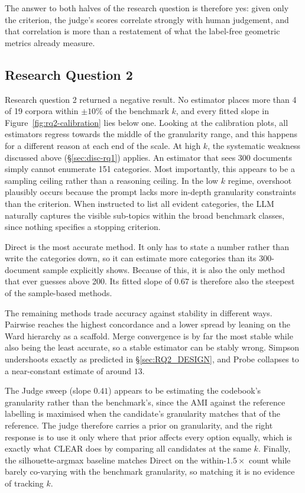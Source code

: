 \documentclass[11pt,a4paper,oneside]{report}
\begin{document}
The answer to both halves of the research question is therefore yes:
given only the criterion, the judge's scores correlate strongly with
human judgement, and that correlation is more than a restatement of what
the label-free geometric metrics already measure.

\subsection{Research Question 2}

Research question 2 returned a negative result. No estimator places more than 4 of 19 corpora within $\pm 10\%$ of the benchmark $k$, and every fitted slope in Figure~\ref{fig:rq2-calibration} lies below one. Looking at the calibration plots, all estimators regress towards the middle of the granularity range, and this happens for a different reason at each end of the scale. At high $k$, the systematic weakness discussed above (\S\ref{sec:disc-rq1}) applies. An estimator that sees 300 documents simply cannot enumerate 151 categories. Most importantly, this appears to be a sampling ceiling rather than a reasoning ceiling. In the low $k$ regime, overshoot plausibly occurs because the prompt lacks more in-depth granularity constraints than the criterion. When instructed to list all evident categories, the LLM naturally captures the visible sub-topics within the broad benchmark classes, since nothing specifies a stopping criterion.

Direct is the most accurate method. It only has to state a number rather than write the categories down, so it can estimate more categories than its 300-document
sample explicitly shows. Because of this, it is also the only method that ever guesses above 200. Its fitted slope of $0.67$ is therefore also the steepest of the sample-based methods. 

The remaining methods trade accuracy against stability in different ways. Pairwise reaches the highest concordance and a lower spread by leaning on the Ward hierarchy as a scaffold. Merge convergence is by far the most stable while also being the least accurate, so a stable estimator can be stably wrong.
Simpson undershoots exactly as predicted in \S\ref{sec:RQ2_DESIGN}, and
Probe collapses to a near-constant estimate of around $13$. 

The Judge sweep (slope $0.41$) appears to be estimating the codebook's
granularity rather than the benchmark's, since the AMI against the
reference labelling is maximised when the candidate's granularity matches
that of the reference. The judge therefore carries a prior on granularity, and the right
response is to use it only where that prior affects every option equally,
which is exactly what CLEAR does by comparing all candidates at the
same $k$. Finally, the silhouette-argmax baseline matches Direct on the within-$1.5\times$ count while barely co-varying with the benchmark granularity, so matching it is no evidence of tracking $k$.
\end{document}
